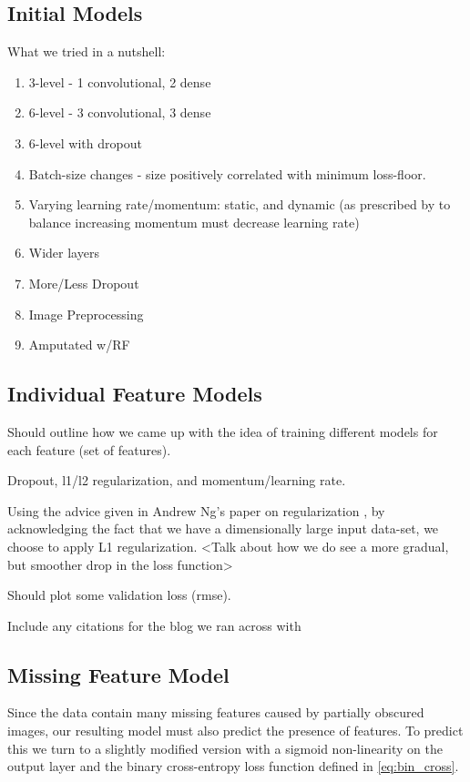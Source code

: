 \documentclass[journal]{IEEEtran}
\begin{document}
\subsection{Initial Models}
What we tried in a nutshell:
\begin{enumerate}
\item 3-level - 1 convolutional, 2 dense
\item 6-level - 3 convolutional, 3 dense
\item 6-level with dropout
\item Batch-size changes - size positively correlated with minimum loss-floor.
\item Varying learning rate/momentum: static, and dynamic (as prescribed by \cite{lasagnenesterov} to balance increasing momentum must decrease learning rate)
\item Wider layers
\item More/Less Dropout
\item Image Preprocessing
\item Amputated w/RF
\end{enumerate}

\subsection{Individual Feature Models}
Should outline how we came up with the idea of training different models for each feature (set of features).


Dropout, l1/l2 regularization, and momentum/learning rate.


Using the advice given in Andrew Ng's paper on regularization \cite{ng2004feature}, by acknowledging the fact that we have a dimensionally large input data-set, we choose to apply L1 regularization. <Talk about how we do see a more gradual, but smoother drop in the loss function>

Should plot some validation loss (rmse).

Include any citations for the blog we ran across with \cite{dnouri}

\subsection{Missing Feature Model}
Since the data contain many missing features caused by partially obscured images, our resulting model must also predict the presence of features.  To predict this we turn to a slightly modified version with a sigmoid non-linearity on the output layer and the binary cross-entropy loss function defined in \cref{eq:bin_cross}.
\end{document}

